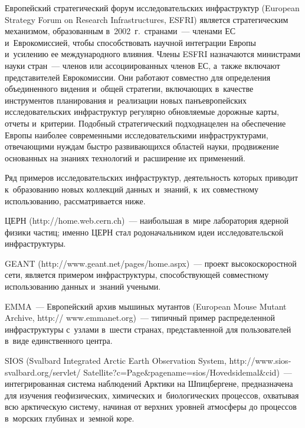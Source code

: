 \begin{multicols}{2}
  Европейский стратегический форум исследовательских инфраструктур (European
  Strategy Forum on Research Infrastructures, ESFRI) является 
стратегическим механизмом, образованным в~2002~г.\ странами~--- членами ЕС 
и~Еврокомиссией, чтобы способствовать научной интеграции Европы и~усилению ее 
международного влияния. Члены ESFRI назначаются министрами науки стран~--- членов 
или ассоциированных членов ЕС, а~также включают представителей Еврокомиссии. Они 
работают совместно для определения объединенного видения и~общей стратегии, 
включающих в~качестве инструментов планирования и~реализации новых 
панъевропейских исследовательских инфраструктур регулярно обновляемые дорожные 
карты, отче\-ты и~критерии. Подобный стратегический подход\linebreak нацелен на обеспечение 
Европы наиболее совре\-менными исследовательскими инфраструктурами, отвечающими 
нуждам быстро развивающихся областей науки, продвижение основанных на знаниях 
технологий и~расширение их применений.
  
  Ряд примеров исследовательских инфраструктур, деятельность которых приводит 
к~образованию новых коллекций данных и~знаний, к~их совместному использованию, 
рассматривается ниже.
  
  ЦЕРН ({\sf http://home.web.cern.ch})~--- наибольшая в~мире лаборатория ядерной физики 
частиц; именно ЦЕРН стал родоначальником идеи исследовательской инфраструктуры.
  
  GEANT ({\sf http://www.geant.net/pages/home.\linebreak aspx})~--- проект высокоскоростной сети, 
является примером инфраструктуры, способствующей совместному использованию 
данных и~знаний учеными.
  
  EMMA~--- Европейский архив мышиных мутантов (European Mouse Mutant Archive, {\sf 
http:// www.emmanet.org})~--- типичный пример распределенной инфраструктуры с~узлами 
в~шести странах, представленной для пользователей в~виде единственного центра.
  
  SIOS (Svalbard Integrated Arctic Earth Observation System,  
{\sf http://www.sios-svalbard.org/servlet/\linebreak 
Satellite?c=Page\&pagename=sios/Hovedsidemal\&cid})~--- 
интегрированная система наблюдений Арктики на Шпицбергене, предназначена для 
изучения геофизических, химических и~биологических процессов, охватывая всю 
арктическую систему, начиная от верхних уровней атмосферы до процессов в~морских 
глубинах и~земной коре.
  

\end{multicols}
